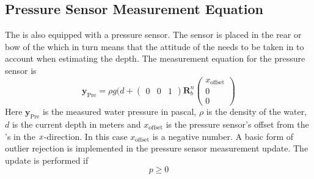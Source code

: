 \subsection{Pressure Sensor Measurement Equation}
The \abbrROV is also equipped with a pressure sensor. The sensor is placed in the rear or bow of the \abbrROV which in turn means that the attitude of the \abbrROV needs to be taken in to account when estimating the depth.
The measurement equation for the pressure sensor is
\begin{equation}
 \boldsymbol{y}_{\text{Pre}}=  \rho g (d + \begin{pmatrix}
    0 & 0 & 1
\end{pmatrix} \boldsymbol{R}^n_b 
\begin{pmatrix}
x_{\text{offset}}\\
0\\
0
\end{pmatrix}
\end{equation}
Here $\boldsymbol{y}_{\text{Pre}}$ is the measured water pressure in pascal, $\rho$ is the density of the water, $d$ is the current depth in meters and $x_{\text{offset}}$ is the pressure sensor's offset from the \abbrROV's \abbrCO in the $x$-direction. In this case $x_{\textrm{offset}}$ is a negative number. A basic form of outlier rejection is implemented in the pressure sensor measurement update. The update is performed if
\begin{equation}
    p \geq 0
\end{equation}